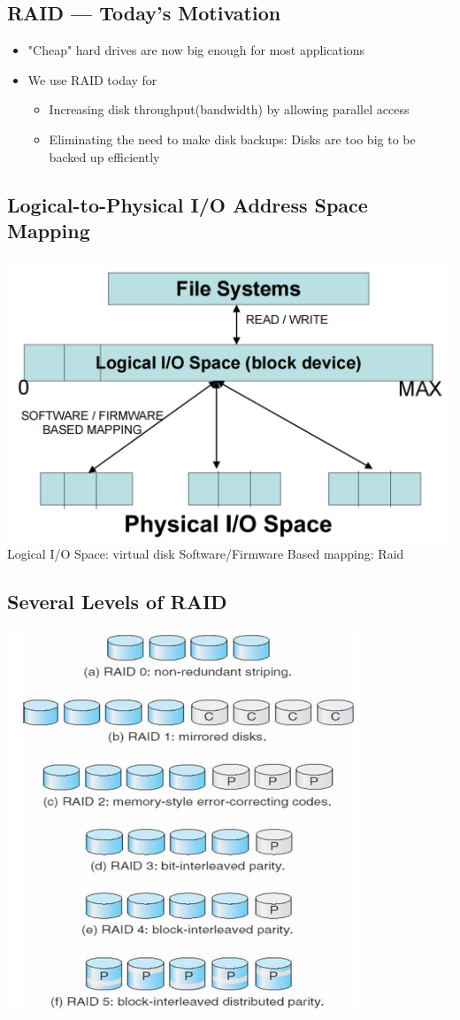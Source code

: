 \documentclass[12pt]{article}
\begin{document}
\subsection{RAID — Today’s Motivation}
\begin{itemize}
    \item "Cheap" hard drives are now big enough for most applications
    \item We use RAID today for \begin{itemize}
        \item Increasing disk throughput(bandwidth) by allowing parallel access
        \item Eliminating the need to make disk backups: Disks are too big to be backed up efficiently
    \end{itemize}
\end{itemize}
\subsection{Logical-to-Physical I/O Address Space Mapping}
\includegraphics[width=\textwidth]{LogicalToPhysicalAddressSpaceMapping.png}
Logical I/O Space: virtual disk
\newline
Software/Firmware Based mapping: Raid
\subsection{Several Levels of RAID}
\includegraphics[width=0.8\textwidth]{RaidLevels.png}
\end{document}
